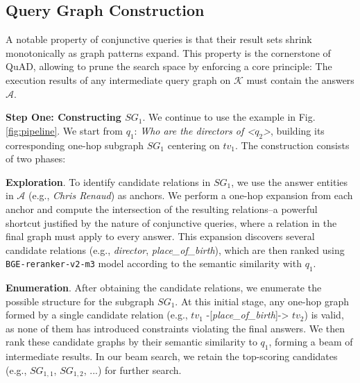 \documentclass[runningheads]{llncs}
\begin{document}
\subsection{Query Graph Construction}\label{subsec:query_graph_construction}

A notable property of conjunctive queries is that their result sets shrink monotonically as graph patterns expand.
This property is the cornerstone of QuAD, allowing to prune the search space by enforcing a core principle: The execution results of any intermediate query graph on $\mathcal{K}$ must contain the answers $\mathcal{A}$.

\noindent \textbf{Step One: Constructing $SG_1$}.
We continue to use the example in Fig. \ref{fig:pipeline}. We start from $q_1$: \textit{Who are the directors of <$q_2$>}, building its corresponding one-hop subgraph $SG_1$ centering on $tv_1$. The construction consists of two phases:

\textbf{Exploration}. 
To identify candidate relations in $SG_1$, we use the answer entities in $\mathcal{A}$ (e.g., \textit{Chris Renaud}) as anchors. We perform a one-hop expansion from each anchor and compute the intersection of the resulting relations--a powerful shortcut justified by the nature of conjunctive queries, where a relation in the final graph must apply to every answer.
This expansion discovers several candidate relations (e.g., \textit{director}, \textit{place\_of\_birth}), which are then ranked using \texttt{BGE-reranker-v2-m3} model according to the semantic similarity with $q_1$. 

\textbf{Enumeration}.
After obtaining the candidate relations, we enumerate the possible structure for the subgraph $SG_1$. At this initial stage, any one-hop graph formed by a single candidate relation (e.g., $tv_1$ -[\textit{place\_of\_birth}]-> $tv_2$) is valid, as none of them has introduced constraints violating the final answers.  We then rank these candidate graphs by their semantic similarity to $q_1$, forming a beam of intermediate results. In our beam search, we retain the top-scoring candidates (e.g., $SG_{1,1}$, $SG_{1,2}$, ...) for further search.
\end{document}
